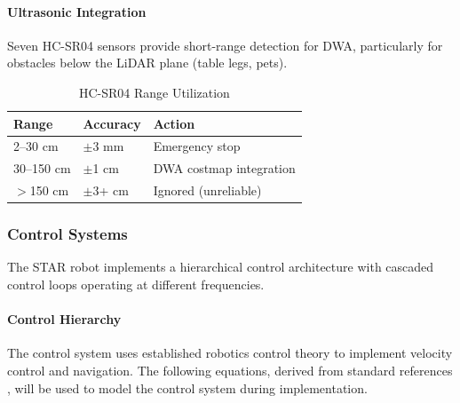 \paragraph{Ultrasonic Integration}

Seven HC-SR04 sensors provide short-range detection for DWA, particularly for obstacles below the LiDAR plane (table legs, pets).

\begin{table}[H]
\centering
\caption{HC-SR04 Range Utilization}
\begin{tabular}{@{}lll@{}}
\toprule
\textbf{Range} & \textbf{Accuracy} & \textbf{Action} \\
\midrule
2--30 cm & $\pm$3 mm & Emergency stop \\
30--150 cm & $\pm$1 cm & DWA costmap integration \\
$>$150 cm & $\pm$3+ cm & Ignored (unreliable) \\
\bottomrule
\end{tabular}
\end{table}

\subsubsection{Control Systems}

The STAR robot implements a hierarchical control architecture with cascaded control loops operating at different frequencies.

\paragraph{Control Hierarchy}

The control system uses established robotics control theory to implement velocity control and navigation. The following equations, derived from standard references \parencite{astrom_pid, siciliano_robotics}, will be used to model the control system during implementation.


